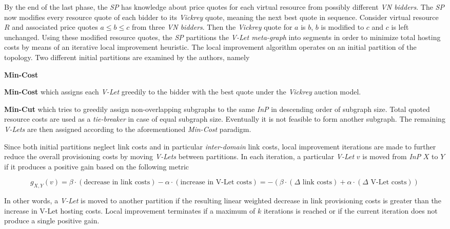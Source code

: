 \documentclass[prodmode,acmtomccap]{acmlarge}
\begin{document}
By the end of the last phase, the \emph{SP} has knowledge about price quotes for each virtual resource from possibly different \emph{VN bidders}. The \emph{SP} now modifies every
resource quote of each bidder to its \emph{Vickrey} quote, meaning the next best quote in sequence. Consider virtual resource $R$ and associated price quotes $a \leq b \leq c$ from three \emph{VN bidders}.
Then the \emph{Vickrey} quote for $a$ is $b$, $b$ is modified to $c$ and $c$ is left unchanged.
Using these modified resource quotes, the \emph{SP} partitions the \emph{V-Let meta-graph} into segments
in order to minimize total hosting costs by means of an iterative local improvement heuristic. The local improvement algorithm operates on an initial partition of the topology. Two different initial partitions are
examined by the authors, namely

\begin{describe}{{\bfseries Min-Cost\/}}
	\item[\bfseries Min-Cost] which assigns each \emph{V-Let} greedily to the bidder with the best quote under the \emph{Vickrey} auction model.
	\item[\bfseries Min-Cut] which tries to greedily assign non-overlapping subgraphs to the same \emph{InP} in descending order of subgraph size. Total quoted resource costs are used as a \emph{tie-breaker}
		in case of equal subgraph size. Eventually it is not feasible to form another subgraph. The remaining \emph{V-Lets} are then assigned according to the aforementioned \emph{Min-Cost} paradigm.
\end{describe}

Since both initial partitions neglect link costs and in particular \emph{inter-domain} link costs, local improvement iterations are made to further reduce the overall provisioning costs by moving
\emph{V-Lets} between partitions. In each iteration, a particular \emph{V-Let} $v$ is moved from \emph{InP} $X$ to $Y$ if it produces a positive gain based on the following metric

$$
	g_{X,Y}(v) = \beta \cdot (\text{decrease in link costs}) - \alpha \cdot (\text{increase in V-Let costs}) = -\left(\beta \cdot (\Delta \text{ link costs}) + \alpha \cdot (\Delta \text{ V-Let costs})\right) 
$$

In other words, a \emph{V-Let} is moved to another partition if the resulting linear weighted decrease in link provisioning costs is greater than the increase in V-Let hosting costs.
Local improvement terminates if a maximum of $k$ iterations is reached or if the current iteration does not produce a single positive gain.
\end{document}
